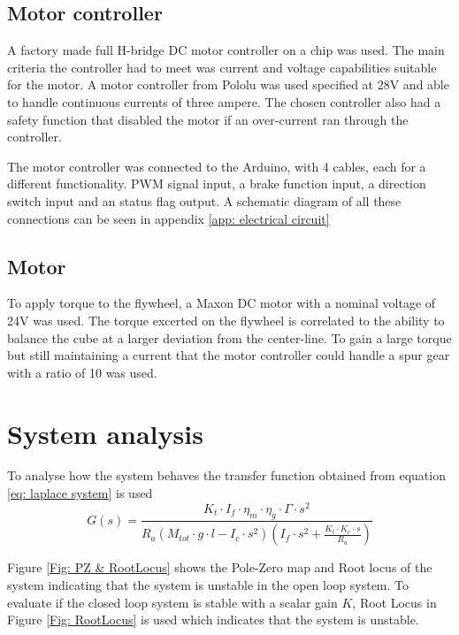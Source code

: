 \documentclass[a4paper,11pt]{kth-mag}
\begin{document}
\subsection{Motor controller}
A factory made full H-bridge DC motor controller on a chip was used. The main criteria the controller had to meet was current and voltage capabilities suitable for the motor. A motor controller from Pololu was used specified at 28V and able to handle continuous currents of three ampere. The chosen controller also had a safety function that disabled the motor if an over-current ran through the controller.

The motor controller was connected to the Arduino, with 4 cables, each for a different functionality. PWM signal input, a brake function input, a direction switch input and an status flag output. A schematic diagram of all these connections can be seen in appendix \ref{app: electrical circuit}

\subsection{Motor}
To apply torque to the flywheel, a Maxon DC motor with a nominal voltage of 24V was used. The torque excerted on the flywheel is correlated to the ability to balance the cube at a larger deviation from the center-line. To gain a large torque but still maintaining a current that the motor controller could handle a spur gear with a ratio of 10 was used. 

\section{System analysis}
To analyse how the system behaves the transfer function obtained from equation \ref{eq: laplace system} is used
\begin{equation}\label{eq: transfer function final}
G(s) = \frac{K_t \cdot I_f \cdot \eta_m \cdot \eta_g \cdot \Gamma \cdot s^2}{R_a (M_{tot} \cdot g \cdot l - I_c \cdot s^2)(I_f \cdot s^2 + \frac{K_t \cdot K_e \cdot s}{R_a})} 
\end{equation}

Figure \ref{Fig: PZ & RootLocus} shows the Pole-Zero map and Root locus of the system indicating that the system is unstable in the open loop system. \cite{regler} To evaluate if the closed loop system is stable with a scalar gain $K$, Root Locus in Figure \ref{Fig: RootLocus} is used which indicates that the system is unstable.
\end{document}
